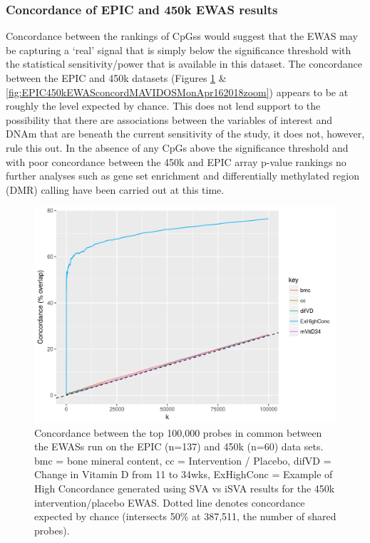 \documentclass[
]{book}
\begin{document}
\hypertarget{concordance-of-epic-and-450k-ewas-results-1}{%
\subsubsection{Concordance of EPIC and 450k EWAS results}\label{concordance-of-epic-and-450k-ewas-results-1}}

Concordance between the rankings of CpGss would suggest that the EWAS may be capturing a `real' signal that is simply below the significance threshold with the statistical sensitivity/power that is available in this dataset.
The concordance between the EPIC and 450k datasets (Figures \ref{fig:EPIC450kEWASconcordMAVIDOSMonApr162018} \& \ref{fig:EPIC450kEWASconcordMAVIDOSMonApr162018zoom}) appears to be at roughly the level expected by chance.
This does not lend support to the possibility that there are associations between the variables of interest and DNAm that are beneath the current sensitivity of the study, it does not, however, rule this out.
In the absence of any CpGs above the significance threshold and with poor concordance between the 450k and EPIC array p-value rankings no further analyses such as gene set enrichment and differentially methylated region (DMR) calling have been carried out at this time.

\begin{figure}

{\centering \includegraphics[width=0.8\linewidth]{figs/EPIC450kEWASconcordMAVIDOSMonApr162018} 

}

\caption{Concordance between the top 100,000 probes in common between the EWASs run on the EPIC (n=137) and 450k (n=60) data sets. bmc = bone mineral content, cc = Intervention / Placebo, difVD = Change in Vitamin D from 11 to 34wks, ExHighConc = Example of High Concordance generated using SVA vs iSVA results for the 450k intervention/placebo EWAS. Dotted line denotes concordance expected by chance (intersects 50\% at 387,511, the number of shared probes).}\label{fig:EPIC450kEWASconcordMAVIDOSMonApr162018}
\end{figure}
\end{document}
